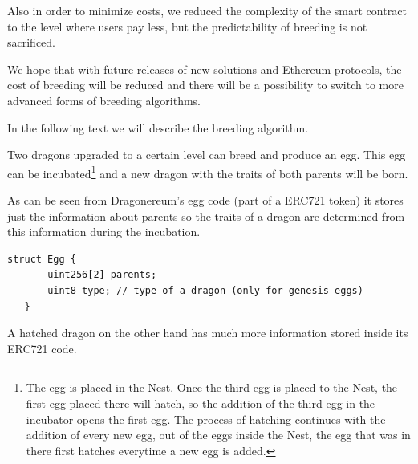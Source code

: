 \documentclass[12pt]{article}
\begin{document}
Also in order to minimize costs, we reduced the complexity of the smart contract to the level where users pay less, but the predictability of breeding is not sacrificed.\par

We hope that with future releases of new solutions and Ethereum protocols, the cost of breeding will be reduced and there will be a possibility to switch to more advanced forms of breeding algorithms.\par

In the following text we will describe the breeding algorithm.\par

Two dragons upgraded to a certain level can breed and produce an egg. This egg can be incubated\footnote{The egg is placed in the Nest. Once the third egg is placed to the Nest, the first egg placed there will hatch, so the addition of the third egg in the incubator opens the first egg. The process of hatching continues with the addition of every new egg, out of the eggs inside the Nest, the egg that was in there first hatches everytime a new egg is added.}  and a new dragon with the traits of both parents will be born.\par

As can be seen from Dragonereum’s egg code (part of a ERC721 token) it stores just the information about parents so the traits of a dragon are determined from this information during the incubation.\par



\begin{footnotesize}
\begin{verbatim}
struct Egg {
       uint256[2] parents;
       uint8 type; // type of a dragon (only for genesis eggs)
   }

\end{verbatim}
\end{footnotesize}

A hatched dragon on the other hand has much more information stored inside its ERC721 code.\par
\end{document}

